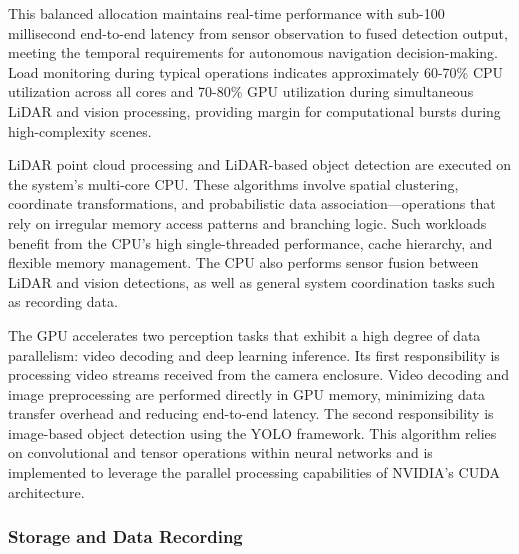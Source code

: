 \documentclass{erauthesis}
\begin{document}
This balanced allocation maintains real-time performance with sub-100 millisecond end-to-end latency from sensor observation to fused detection output, meeting the temporal requirements for autonomous navigation decision-making.
Load monitoring during typical operations indicates approximately 60-70\% CPU utilization across all cores and 70-80\% GPU utilization during simultaneous LiDAR and vision processing, providing margin for computational bursts during high-complexity scenes.


LiDAR point cloud processing and LiDAR-based object detection are executed on the system’s multi-core CPU.
These algorithms involve spatial clustering, coordinate transformations, and probabilistic data association—operations that rely on irregular memory access patterns and branching logic.
Such workloads benefit from the CPU’s high single-threaded performance, cache hierarchy, and flexible memory management.
The CPU also performs sensor fusion between LiDAR and vision detections, as well as general system coordination tasks such as recording data. %


The GPU accelerates two perception tasks that exhibit a high degree of data parallelism: video decoding and deep learning inference.
Its first responsibility is processing video streams received from the camera enclosure. 
Video decoding and image preprocessing are performed directly in GPU memory, minimizing data transfer overhead and reducing end-to-end latency.
The second responsibility is image-based object detection using the \ac{YOLO} framework. 
This algorithm relies on convolutional and tensor operations within neural networks and is implemented to leverage the parallel processing capabilities of NVIDIA’s CUDA architecture.

\subsubsection{Storage and Data Recording}
\end{document}
